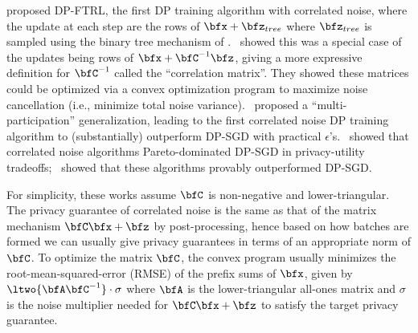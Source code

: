 \citet{kairouz2021practical} proposed DP-FTRL, the first DP training algorithm with correlated noise, where the update at each step are the rows of $\bfx + \bfz_{tree}$ where $\bfz_{tree}$ is sampled using the binary tree mechanism of \cite{Dwork-continual}.~\citet{denisov2022improved} showed this was a special case of the updates being rows of $\bfx + \bfC^{-1} \bfz$, giving a more expressive definition for $\bfC^{-1}$ called the ``correlation matrix''. They showed these matrices could be optimized via a convex optimization program to maximize noise cancellation (i.e., minimize total noise variance).~\citet{choquette2022multi} proposed a ``multi-participation'' generalization, leading to the first correlated noise DP training algorithm to (substantially) outperform DP-SGD with practical $\epsilon$'s.~\citet{choquette2024amplified} showed that correlated noise algorithms Pareto-dominated DP-SGD in privacy-utility tradeoffs;~\citet{choquette2023correlated} showed that these algorithms provably outperformed DP-SGD.

For simplicity, these works assume $\bfC$ is non-negative and lower-triangular. The privacy guarantee of correlated noise is the same as that of the matrix mechanism $\bfC \bfx + \bfz$ by post-processing, hence based on how batches are formed we can usually give privacy guarantees in terms of an appropriate norm of $\bfC$. To optimize the matrix $\bfC$, the convex program usually minimizes the root-mean-squared-error (RMSE) of the prefix sums of $\bfx$, given by $\ltwo{\bfA \bfC^{-1}} \cdot \sigma$ where $\bfA$ is the lower-triangular all-ones matrix and $\sigma$ is the noise multiplier needed for $\bfC \bfx + \bfz$ to satisfy the target privacy guarantee.